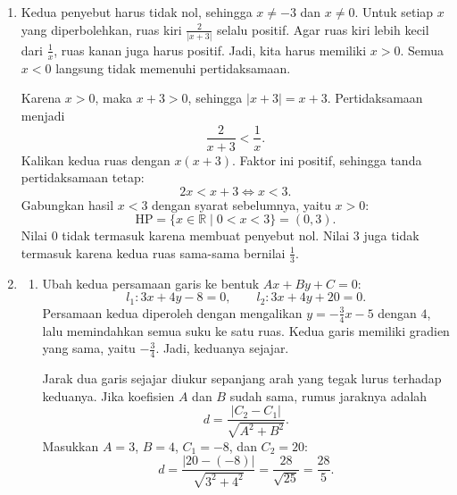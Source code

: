 \documentclass[11pt,a4paper]{article}
\begin{document}
\begin{enumerate}
  \item Kedua penyebut harus tidak nol, sehingga $x\ne-3$ dan $x\ne0$.
    Untuk setiap $x$ yang diperbolehkan, ruas kiri $\frac{2}{|x+3|}$ selalu positif.
    Agar ruas kiri lebih kecil dari $\frac1x$, ruas kanan juga harus positif.
    Jadi, kita harus memiliki $x>0$.
    Semua $x<0$ langsung tidak memenuhi pertidaksamaan.

    Karena $x>0$, maka $x+3>0$, sehingga $|x+3|=x+3$.
    Pertidaksamaan menjadi
    \[
      \frac2{x+3}<\frac1x.
    \]
    Kalikan kedua ruas dengan $x(x+3)$.
    Faktor ini positif, sehingga tanda pertidaksamaan tetap:
    \[
      2x<x+3\iff x<3.
    \]
    Gabungkan hasil $x<3$ dengan syarat sebelumnya, yaitu $x>0$:
    \[
      \boxed{\mathrm{HP}=\{x\in\mathbb{R}\mid0<x<3\}=(0,3)}.
    \]
    Nilai $0$ tidak termasuk karena membuat penyebut nol.
    Nilai $3$ juga tidak termasuk karena kedua ruas sama-sama bernilai $\frac13$.

  \item
    \begin{enumerate}
      \item Ubah kedua persamaan garis ke bentuk $Ax+By+C=0$:
        \[
          l_1:3x+4y-8=0,\qquad
          l_2:3x+4y+20=0.
        \]
        Persamaan kedua diperoleh dengan mengalikan
        $y=-\frac34x-5$ dengan $4$, lalu memindahkan semua suku ke satu ruas.
        Kedua garis memiliki gradien yang sama, yaitu $-\frac34$.
        Jadi, keduanya sejajar.

        Jarak dua garis sejajar diukur sepanjang arah yang tegak lurus terhadap keduanya.
        Jika koefisien $A$ dan $B$ sudah sama, rumus jaraknya adalah
        \[
          d=\frac{|C_2-C_1|}{\sqrt{A^2+B^2}}.
        \]
        Masukkan $A=3$, $B=4$, $C_1=-8$, dan $C_2=20$:
        \[
          d=\frac{|20-(-8)|}{\sqrt{3^2+4^2}}
            =\frac{28}{\sqrt{25}}=\boxed{\frac{28}{5}}.
        \]


\end{enumerate}
\end{enumerate}
\end{document}
